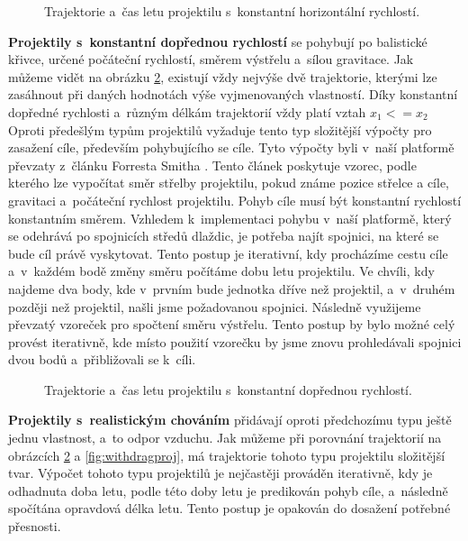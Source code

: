 \begin{figure}[h]
	\centering
	\def\svgwidth{0.7\textwidth}
	
	\caption{Trajektorie a~čas letu projektilu s~konstantní horizontální rychlostí.}
	\label{fig:horizontalproj}
\end{figure}

\textbf{Projektily s~konstantní dopřednou rychlostí} se pohybují po balistické křivce, určené počáteční rychlostí, směrem výstřelu a~sílou gravitace. Jak můžeme vidět na obrázku \ref{fig:forwardproj}, existují vždy nejvýše dvě trajektorie, kterými lze zasáhnout při daných hodnotách výše vyjmenovaných vlastností. Díky konstantní dopředné rychlosti a~různým délkám trajektorií vždy platí vztah \(x_1 <= x_2\) Oproti předešlým typům projektilů vyžaduje tento typ složitější výpočty pro zasažení cíle, především pohybujícího se cíle. Tyto výpočty byli v~naší platformě převzaty z~článku Forresta Smitha \citep{site:projectilecalc}. Tento článek poskytuje vzorec, podle kterého lze vypočítat směr střelby projektilu, pokud známe pozice střelce a cíle, gravitaci a~počáteční rychlost projektilu. Pohyb cíle musí být konstantní rychlostí konstantním směrem. Vzhledem k~implementaci pohybu v~naší platformě, který se odehrává po spojnicích středů dlaždic, je potřeba najít spojnici, na které se bude cíl právě vyskytovat. Tento postup je iterativní, kdy procházíme cestu cíle a~v~každém bodě změny směru počítáme dobu letu projektilu. Ve chvíli, kdy najdeme dva body, kde v~prvním bude jednotka dříve než projektil, a~v~druhém později než projektil, našli jsme požadovanou spojnici. Následně využijeme převzatý vzoreček pro spočtení směru výstřelu. Tento postup by bylo možné celý provést iterativně, kde místo použití vzorečku by jsme znovu prohledávali spojnici dvou bodů a~přibližovali se k~cíli.

\begin{figure}[h]
	\centering
	\def\svgwidth{0.7\textwidth}
	
	\caption{Trajektorie a~čas letu projektilu s~konstantní dopřednou rychlostí.}
	\label{fig:forwardproj}
\end{figure}

\textbf{Projektily s~realistickým chováním} přidávají oproti předchozímu typu ještě jednu vlastnost, a~to odpor vzduchu. Jak můžeme při porovnání trajektorií na obrázcích \ref{fig:forwardproj} a \ref{fig:withdragproj}, má trajektorie tohoto typu projektilu složitější tvar.  Výpočet tohoto typu projektilů je nejčastěji prováděn iterativně, kdy je odhadnuta doba letu, podle této doby letu je predikován pohyb cíle, a~následně spočítána opravdová délka letu. Tento postup je opakován do dosažení potřebné přesnosti.

